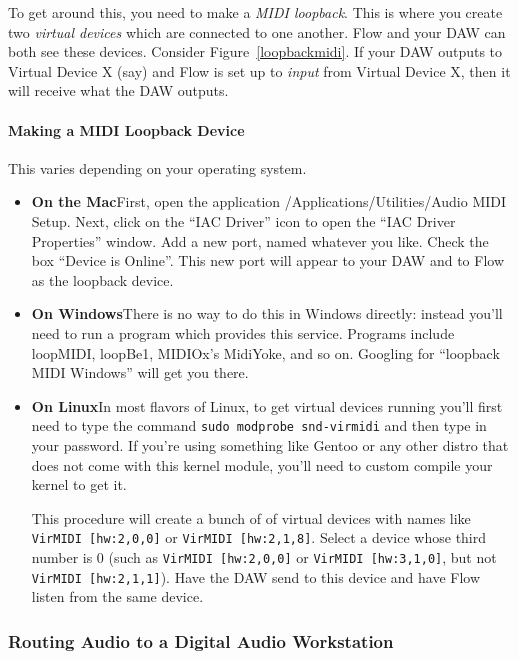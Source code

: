 \documentclass{article}
\newcommand\name{Flow}
\begin{document}
To get around this, you need to make a {\it MIDI loopback}.  This is where you create two {\it virtual devices} which are connected to one another.  {\name} and your DAW can both see these devices.  Consider Figure~\ref{loopbackmidi}.  If your DAW outputs to Virtual Device X (say) and {\name} is set up to {\it input} from Virtual Device X, then it will receive what the DAW outputs.

\paragraph{Making a MIDI Loopback Device}  This varies depending on your operating system.

\begin{itemize}
\item {\bf On the Mac}\quad First, open the application \textsf{/Applications/Utilities/Audio MIDI Setup}.  Next, click on the ``IAC Driver'' icon to open the ``IAC Driver Properties'' window.  Add a new port, named whatever you like.  Check the box ``Device is Online''.  This new port will appear to your DAW and to {\name} as the loopback device.

\item {\bf On Windows}\quad There is no way to do this in Windows directly: instead you'll need to run a program which provides this service.  Programs include {\sf loopMIDI},  {\sf loopBe1}, MIDIOx's {\sf MidiYoke}, and so on.  Googling for ``loopback MIDI Windows'' will get you there. 

\item {\bf On Linux}\quad In most flavors of Linux, to get virtual devices running you'll first need to type the command \hbox{\tt sudo modprobe snd-virmidi} and then type in your password.  \quad If you're using something like Gentoo or any other distro that does not come with this kernel module, you'll need to custom compile your kernel to get it. 

This procedure will create a bunch of of virtual devices with names like {\tt VirMIDI [hw:2,0,0]} or {\tt VirMIDI [hw:2,1,8]}.  Select a device whose third number is 0 (such as {\tt VirMIDI [hw:2,0,0]} or {\tt VirMIDI [hw:3,1,0]}, but not {\tt VirMIDI [hw:2,1,1]}).  Have the DAW send to this device and have {\name} listen from the same device.
\end{itemize}

\subsubsection{Routing Audio to a Digital Audio Workstation}
\label{audioloopback}
\end{document}

